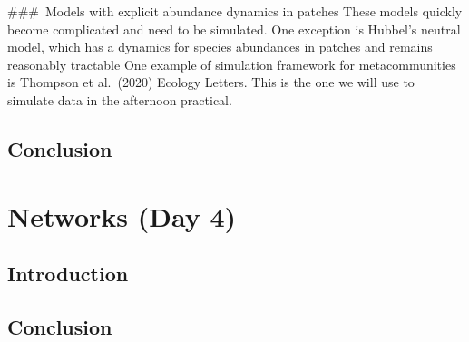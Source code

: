 \documentclass[
]{book}
\theoremstyle{definition}
\theoremstyle{definition}
\theoremstyle{definition}
\theoremstyle{definition}
\theoremstyle{remark}
\begin{document}
\#\#\#~Models with explicit abundance dynamics in patches
These models quickly become complicated and need to be simulated.
One exception is Hubbel's neutral model, which has a dynamics for species abundances in patches and remains reasonably tractable
One example of simulation framework for metacommunities is Thompson et al.~(2020) Ecology Letters. This is the one we will use to simulate data in the afternoon practical.

\section{Conclusion}\label{conclusion-1}

\chapter{Networks (Day 4)}\label{networks-day-4}

\section{Introduction}\label{introduction-2}

\section{Conclusion}\label{conclusion-2}

  
\end{document}
